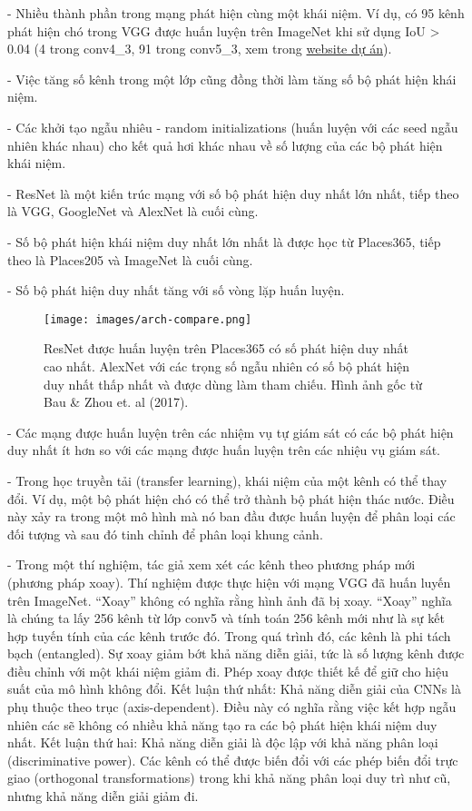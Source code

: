 - Nhiều thành phần trong mạng phát hiện cùng một khái niệm. Ví dụ, có 95 kênh phát hiện chó trong VGG được huấn luyện trên ImageNet khi sử dụng IoU > 0.04 (4 trong conv4\_3, 91 trong conv5\_3, xem trong \href{http://netdissect.csail.mit.edu/dissect/vgg16_imagenet/}{website dự án}).

- Việc tăng số kênh trong một lớp cũng đồng thời làm tăng số bộ phát hiện khái niệm.

- Các khởi tạo ngẫu nhiêu - random initializations (huấn luyện với các seed ngẫu nhiên khác nhau) cho kết quả hơi khác nhau về số lượng của các bộ phát hiện khái niệm.

- ResNet là một kiến trúc mạng với số bộ phát hiện duy nhất lớn nhất, tiếp theo là VGG, GoogleNet và AlexNet là cuối cùng.

- Số bộ phát hiện khái niệm duy nhất lớn nhất là được học từ Places365, tiếp theo là Places205 và ImageNet là cuối cùng.

- Số bộ phát hiện duy nhất tăng với số vòng lặp huấn luyện.


\begin{figure*}[h!]
	\centering
	\texttt{[image: images/arch-compare.png]}
	\label{fig:7_9}
	\caption{ResNet được huấn luyện trên Places365 có số phát hiện duy nhất cao nhất. AlexNet với các trọng số ngẫu nhiên có số bộ phát hiện duy nhất thấp nhất và được dùng làm tham chiếu. Hình ảnh gốc từ Bau \& Zhou et. al (2017).}
\end{figure*}

- Các mạng được huấn luyện trên các nhiệm vụ tự giám sát có các bộ phát hiện duy nhất ít hơn so với các mạng được huấn luyện trên các nhiệu vụ giám sát.

- Trong học truyền tải (transfer learning), khái niệm của một kênh có thể thay đổi. Ví dụ, một bộ phát hiện chó có thể trở thành bộ phát hiện thác nước. Điều này xảy ra trong một mô hình mà nó ban đầu được huấn luyện để phân loại các đối tượng và sau đó tinh chỉnh để phân loại khung cảnh.

- Trong một thí nghiệm, tác giả xem xét các kênh theo phương pháp mới (phương pháp xoay). Thí nghiệm được thực hiện với mạng VGG đã huấn luyến trên ImageNet. “Xoay” không có nghĩa rằng hình ảnh đã bị xoay. “Xoay” nghĩa là chúng ta lấy 256 kênh từ lớp conv5 và tính toán 256 kênh mới như là sự kết hợp tuyến tính của các kênh trước đó. Trong quá trình đó, các kênh là phi tách bạch (entangled). Sự xoay giảm bớt khả năng diễn giải, tức là số lượng kênh được điều chỉnh với một khái niệm giảm đi. Phép xoay được thiết kế để giữ cho hiệu suất của mô hình không đổi. Kết luận thứ nhất: Khả năng diễn giải của CNNs là phụ thuộc theo trục (axis-dependent). Điều này có nghĩa rằng việc kết hợp ngẫu nhiên các sẽ không có nhiều khả năng tạo ra các bộ phát hiện khái niệm duy nhất. Kết luận thứ hai: Khả năng diễn giải là độc lập với khả năng phân loại (discriminative power). Các kênh có thể được biến đổi với các phép biến đổi trực giao (orthogonal transformations) trong khi khả năng phân loại duy trì như cũ, nhưng khả năng diễn giải giảm đi.

